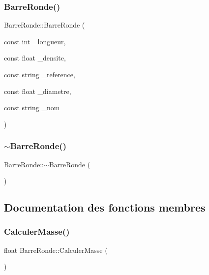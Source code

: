 \subsubsection{\texorpdfstring{Barre\+Ronde()}{BarreRonde()}}
{\footnotesize\ttfamily Barre\+Ronde\+::\+Barre\+Ronde (\begin{DoxyParamCaption}\item[{const int}]{\+\_\+longueur,  }\item[{const float}]{\+\_\+densite,  }\item[{const string}]{\+\_\+reference,  }\item[{const float}]{\+\_\+diametre,  }\item[{const string}]{\+\_\+nom }\end{DoxyParamCaption})}

\mbox{\label{class_barre_ronde_aa62c3c350d2153aefcab64a20a6a795a}} 
\subsubsection{\texorpdfstring{$\sim$\+Barre\+Ronde()}{~BarreRonde()}}
{\footnotesize\ttfamily Barre\+Ronde\+::$\sim$\+Barre\+Ronde (\begin{DoxyParamCaption}{ }\end{DoxyParamCaption})}



\subsection{Documentation des fonctions membres}
\mbox{\label{class_barre_ronde_a450c58e2bfcb1300339f1c790740e5ad}} 
\subsubsection{\texorpdfstring{Calculer\+Masse()}{CalculerMasse()}}
{\footnotesize\ttfamily float Barre\+Ronde\+::\+Calculer\+Masse (\begin{DoxyParamCaption}{ }\end{DoxyParamCaption})}

\mbox{\label{class_barre_ronde_aa405f0463a7681f80a66da91c1d310a9}} 

